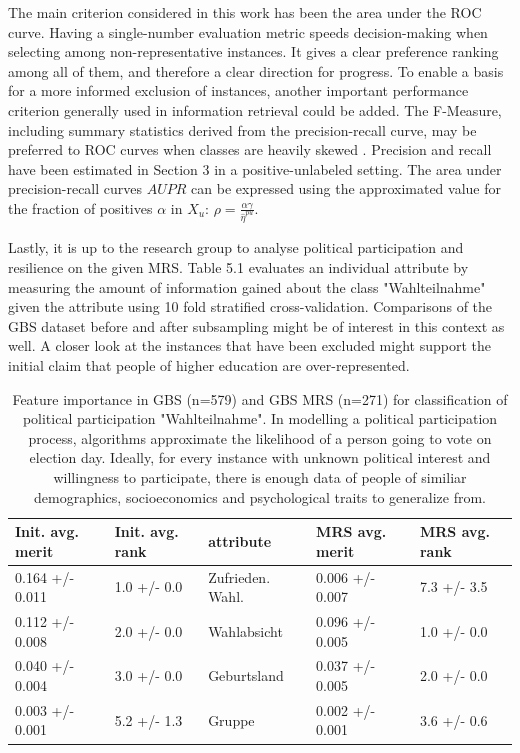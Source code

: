 The main criterion considered in this work has been the area under the ROC curve. Having a single-number evaluation metric speeds decision-making when selecting among non-representative instances. It gives a clear preference ranking among all of them, and therefore a clear direction for progress. To enable a basis for a more informed exclusion of instances, another important performance criterion generally used in information retrieval could be added. The F-Measure, including summary statistics derived from the precision-recall curve, may be preferred to ROC curves when classes are heavily skewed \cite{jesse}. Precision and recall have been estimated in Section 3 in a positive-unlabeled setting. The area under precision-recall curves \(AUPR\) can be expressed using the approximated value for the fraction of positives \(\alpha\) in \(X_u\): \(\rho = \frac{\alpha \gamma}{\hat{\eta}^{pu}}\).

Lastly, it is up to the research group to analyse political participation and resilience on the given MRS. Table 5.1 evaluates an individual attribute by measuring the amount of information gained about the class "Wahlteilnahme" given the attribute using 10 fold stratified cross-validation. Comparisons of the GBS dataset before and after subsampling might be of interest in this context as well. A closer look at the instances that have been excluded might support the initial claim that people of higher education are over-represented. 

\vspace{0.2cm}
\begin{table}[ht]
      \centering
        \begin{tabular}{lllll}
           Init. avg. merit  & Init. avg. rank &  attribute & MRS avg. merit & MRS avg. rank\\
\hline \hline
	0.164 +/- 0.011 & 1.0 +/- 0.0 & Zufrieden. Wahl. & 0.006 +/- 0.007 & 7.3 +/- 3.5 \\
	0.112 +/- 0.008 & 2.0 +/- 0.0 & Wahlabsicht & 0.096 +/- 0.005 & 1.0 +/- 0.0 \\
	0.040 +/- 0.004 & 3.0 +/- 0.0 & Geburtsland & 0.037 +/- 0.005 & 2.0 +/- 0.0 \\
	0.003 +/- 0.001 & 5.2 +/- 1.3 & Gruppe & 0.002 +/- 0.001 & 3.6 +/- 0.6 \\
        \end{tabular}
\caption{Feature importance in GBS (n=579) and GBS MRS (n=271) for classification of political participation "Wahlteilnahme". In modelling a political participation process, algorithms approximate the likelihood of a person going to vote on election day. Ideally, for every instance with unknown political interest and willingness to participate, there is enough data of people of similiar demographics, socioeconomics and psychological traits to generalize from.}
\end{table}